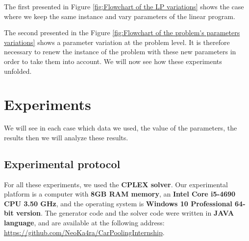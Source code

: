 \documentclass[12pt, a4paper, twoside]{memoir}
\newcommand{\newpar}{\vskip 0.2in \noindent}
\begin{document}
{	\noindent The first presented in Figure \ref{fig:Flowchart of the LP variations} shows the case where we keep the same instance and vary parameters of the linear program. 

	\noindent The second presented in the Figure \ref{fig:Flowchart of the problem's parameters variations} shows a parameter variation at the problem level. It is therefore necessary to renew the instance of the problem with these new parameters in order to take them into account.
	\newpar
	We will now see how these experiments unfolded.
	
	\cleardoublepage
	\chapter{Experiments}
	
	We will see in each case which data we used, the value of the parameters, the results then we will analyze these results.
	
	\section{Experimental protocol}
	
	For all these experiments, we used the \textbf{CPLEX solver}. Our experimental platform is a computer with \textbf{8GB RAM memory}, an \textbf{Intel Core i5-4690 CPU 3.50 GHz}, and the operating system is \textbf{Windows 10 Professional 64-bit version}. The generator code and the solver code were written in \textbf{JAVA language}, and are available at the following address: \url{https://github.com/NeoKa4ra/CarPoolingInternship}.
	
}
\end{document}
